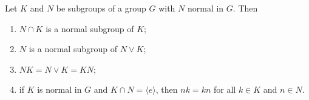 \begin{theorem}
Let $K$ and $N$ be subgroups of a group $G$ with $N$ normal in $G$. Then
\begin{enumerate}
    \item[(i)] $N \cap K$ is a normal subgroup of $K$;
    \item[(ii)] $N$ is a normal subgroup of $N \vee K$;
    \item[(iii)] $NK = N \vee K = KN$;
    \item[(iv)] if $K$ is normal in $G$ and $K \cap N = \langle e \rangle$, then $nk = kn$ for all $k \in K$ and $n \in N$.
\end{enumerate}
\end{theorem}
